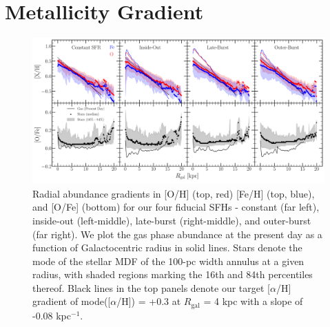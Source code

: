 \documentclass[fleqn, usenatbib]{mnras}
\begin{document}
\section{Metallicity Gradient} 
\label{sec:metallicity_gradient} 

\begin{figure} 
\centering 
\includegraphics[scale = 0.32]{metallicity_gradient.pdf} 
\caption{Radial abundance gradients in [O/H] (top, red) [Fe/H] (top, blue), 
and [O/Fe] (bottom) for our four fiducial SFHs - constant (far left), 
inside-out (left-middle), late-burst (right-middle), and outer-burst (far 
right). We plot the gas phase abundance at the present day as a function of 
Galactocentric radius in solid lines. Stars denote the mode of the stellar 
MDF of the 100-pc width annulus at a given radius, with shaded regions 
marking the 16th and 84th percentiles thereof. Black lines in the top panels 
denote our target [$\alpha$/H] gradient of mode([$\alpha$/H]) = +0.3 at 
$R_\text{gal}$ = 4 kpc with a slope of -0.08 kpc$^{-1}$. } 
\label{fig:metallicity_gradient} 
\end{figure} 
\end{document}
